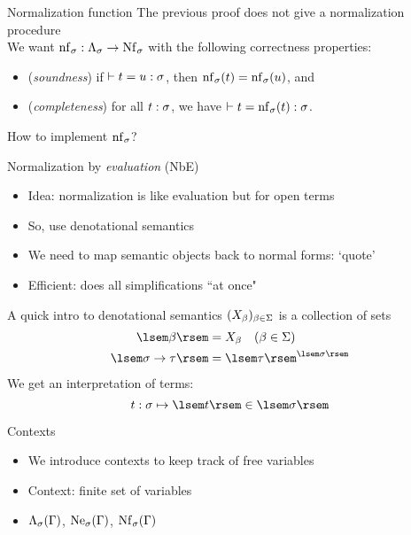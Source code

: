 \documentclass{beamer}
\begin{document}
\begin{frame}{Normalization function}
The previous proof does not give a normalization procedure \\
We want $\name{nf}_\sigma : \Tm[\sigma] \to \Nf[\sigma]$ with the following correctness properties:
\begin{itemize}
    \item (\textit{soundness}) if $\vdash t = u : \sigma$, then $\mathrm{nf}_\sigma(t) = \mathrm{nf}_\sigma(u)$, and
    \item (\textit{completeness}) for all $t : \sigma$, we have $\vdash t = \mathrm{nf}_\sigma(t) : \sigma$.
\end{itemize}
\vspace{6pt}
How to implement $\mathrm{nf}_\sigma$?
\end{frame}

\begin{frame}{Normalization by \textit{evaluation} (NbE)}
\begin{itemize}
    \item Idea: normalization is like evaluation but for open terms
    \item So, use denotational semantics
    \item We need to map semantic objects back to normal forms: `quote'
    \item Efficient: does all simplifications ``at once"
\end{itemize}
\end{frame}

\begin{frame}{A quick intro to denotational semantics}
$(X_\beta)_{\beta \in \Sigma}$ is a collection of sets
\begin{align*}
    \sem{\beta} &= X_\beta \quad(\beta \in \Basetypes) \\
    \sem{\functy{\sigma}{\tau}} &= \funcset{\sem{\sigma}}{\sem{\tau}}
\end{align*}
We get an interpretation of terms:
\[ \typedtm{t}{\sigma} \mapsto \sem{t} \in \sem{\sigma} \]
\end{frame}

\begin{frame}{Contexts}
\begin{itemize}
    \item We introduce contexts to keep track of free variables
    \item Context: finite set of variables
    \item $\Lambda_{\sigma}(\Gamma)$, $\mathrm{Ne}_{\sigma}(\Gamma)$, $\mathrm{Nf}_{\sigma}(\Gamma)$
\end{itemize}
\end{frame}
\end{document}
